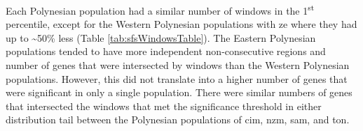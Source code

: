 \documentclass[]{report}
\begin{document}
Each Polynesian population had a similar number of windows in the
1\textsuperscript{st} percentile, except for the Western Polynesian
populations with \gls{ze} where they had up to \textasciitilde{}50\%
less (Table \ref{tab:sfsWindowsTable}). The Eastern Polynesian
populations tended to have more independent non-consecutive regions and
number of genes that were intersected by windows than the Western
Polynesian populations. However, this did not translate into a higher
number of genes that were significant in only a single population. There
were similar numbers of genes that intersected the windows that met the
significance threshold in either distribution tail between the
Polynesian populations of \gls{cim}, \gls{nzm}, \gls{sam}, and
\gls{ton}.

\begin{table}


\end{table}
\end{document}
